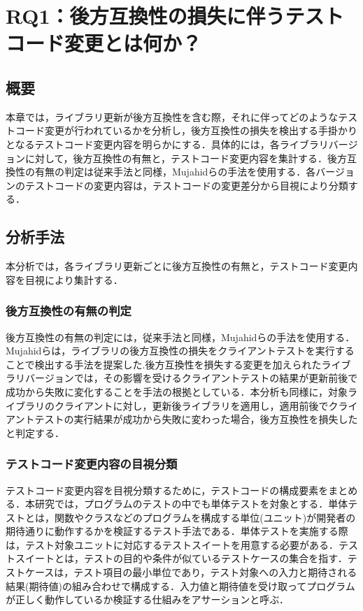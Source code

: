\documentclass[11pt,dvipdfmx]{jreport}
\begin{document}
\chapter{RQ1：後方互換性の損失に伴うテストコード変更とは何か？}\label{chap:rq1}

\section{概要}
本章では，ライブラリ更新が後方互換性を含む際，それに伴ってどのようなテストコード変更が行われているかを分析し，後方互換性の損失を検出する手掛かりとなるテストコード変更内容を明らかにする．具体的には，各ライブラリバージョンに対して，後方互換性の有無と，テストコード変更内容を集計する．後方互換性の有無の判定は従来手法と同様，Mujahidらの手法を使用する．各バージョンのテストコードの変更内容は，テストコードの変更差分から目視により分類する．

\section{分析手法}
本分析では，各ライブラリ更新ごとに後方互換性の有無と，テストコード変更内容を目視により集計する．

\subsection{後方互換性の有無の判定}\label{subsec:kouhougokanseinohantei}
後方互換性の有無の判定には，従来手法と同様，Mujahidらの手法を使用する．Mujahidらは，ライブラリの後方互換性の損失をクライアントテストを実行することで検出する手法を提案した\cite{mujahid}.後方互換性を損失する変更を加えられたライブラリバージョンでは，その影響を受けるクライアントテストの結果が更新前後で成功から失敗に変化することを手法の根拠としている．本分析も同様に，対象ライブラリのクライアントに対し，更新後ライブラリを適用し，適用前後でクライアントテストの実行結果が成功から失敗に変わった場合，後方互換性を損失したと判定する．

\subsection{テストコード変更内容の目視分類}
テストコード変更内容を目視分類するために，テストコードの構成要素をまとめる．本研究では，プログラムのテストの中でも単体テストを対象とする．単体テストとは，関数やクラスなどのプログラムを構成する単位(ユニット)が開発者の期待通りに動作するかを検証するテスト手法である．単体テストを実施する際は，テスト対象ユニットに対応するテストスイートを用意する必要がある．テストスイートとは，テストの目的や条件が似ているテストケースの集合を指す．テストケースは，テスト項目の最小単位であり，テスト対象への入力と期待される結果(期待値)の組み合わせで構成する．入力値と期待値を受け取ってプログラムが正しく動作しているか検証する仕組みをアサーションと呼ぶ．
\end{document}
